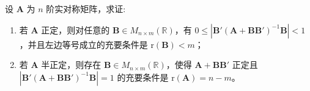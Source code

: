 \documentclass[../../main.tex]{subfiles}
\begin{document}
\begin{example}
设 $\boldsymbol{A}$ 为 $n$ 阶实对称矩阵，求证:
\begin{enumerate}[(1)]
\item 若 $\boldsymbol{A}$ 正定，则对任意的 $\boldsymbol{B} \in M_{n \times m}(\mathbb{R})$，有 $0 \leqslant |\boldsymbol{B}'(\boldsymbol{A} + \boldsymbol{B}\boldsymbol{B}')^{-1}\boldsymbol{B}| < 1$，并且左边等号成立的充要条件是 $\text{r}(\boldsymbol{B}) < m$；

\item 若 $\boldsymbol{A}$ 半正定，则存在 $\boldsymbol{B} \in M_{n \times m}(\mathbb{R})$，使得 $\boldsymbol{A} + \boldsymbol{B}\boldsymbol{B}'$ 正定且 $|\boldsymbol{B}'(\boldsymbol{A} + \boldsymbol{B}\boldsymbol{B}')^{-1}\boldsymbol{B}| = 1$ 的充要条件是 $\text{r}(\boldsymbol{A}) = n - m$。
\end{enumerate}
\end{example}
\end{document}
